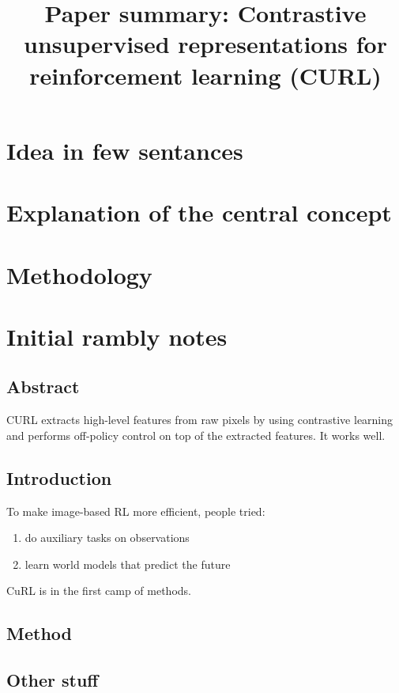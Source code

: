 \documentclass{article}
\title{Paper summary: Contrastive unsupervised representations for reinforcement learning (CURL)}
\begin{document}
\maketitle


\section{Idea in few sentances}



\section{Explanation of the central concept}




\section{Methodology}


\section{Initial rambly notes}


\subsection{Abstract}
CURL extracts high-level features from raw pixels by using contrastive learning
and performs off-policy control on top of the extracted features.
It works well.


\subsection{Introduction}
To make image-based RL more efficient, people tried:
\begin{enumerate}
		\item do auxiliary tasks on observations
		\item learn world models that predict the future
\end{enumerate}
CuRL is in the first camp of methods.






\subsection{Method}


\subsection{Other stuff}
\end{document}
